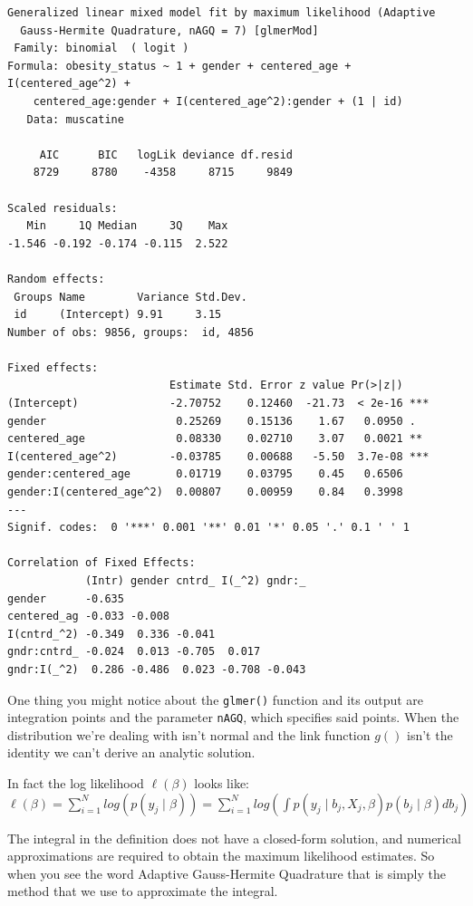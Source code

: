 \documentclass[
  letterpaper,
  DIV=11,
  numbers=noendperiod]{scrreprt}
\begin{document}
\begin{verbatim}
Generalized linear mixed model fit by maximum likelihood (Adaptive
  Gauss-Hermite Quadrature, nAGQ = 7) [glmerMod]
 Family: binomial  ( logit )
Formula: obesity_status ~ 1 + gender + centered_age + I(centered_age^2) +  
    centered_age:gender + I(centered_age^2):gender + (1 | id)
   Data: muscatine

     AIC      BIC   logLik deviance df.resid 
    8729     8780    -4358     8715     9849 

Scaled residuals: 
   Min     1Q Median     3Q    Max 
-1.546 -0.192 -0.174 -0.115  2.522 

Random effects:
 Groups Name        Variance Std.Dev.
 id     (Intercept) 9.91     3.15    
Number of obs: 9856, groups:  id, 4856

Fixed effects:
                         Estimate Std. Error z value Pr(>|z|)    
(Intercept)              -2.70752    0.12460  -21.73  < 2e-16 ***
gender                    0.25269    0.15136    1.67   0.0950 .  
centered_age              0.08330    0.02710    3.07   0.0021 ** 
I(centered_age^2)        -0.03785    0.00688   -5.50  3.7e-08 ***
gender:centered_age       0.01719    0.03795    0.45   0.6506    
gender:I(centered_age^2)  0.00807    0.00959    0.84   0.3998    
---
Signif. codes:  0 '***' 0.001 '**' 0.01 '*' 0.05 '.' 0.1 ' ' 1

Correlation of Fixed Effects:
            (Intr) gender cntrd_ I(_^2) gndr:_
gender      -0.635                            
centered_ag -0.033 -0.008                     
I(cntrd_^2) -0.349  0.336 -0.041              
gndr:cntrd_ -0.024  0.013 -0.705  0.017       
gndr:I(_^2)  0.286 -0.486  0.023 -0.708 -0.043
\end{verbatim}

One thing you might notice about the \texttt{glmer()} function and its
output are integration points and the parameter \texttt{nAGQ}, which
specifies said points. When the distribution we're dealing with isn't
normal and the link function \(g()\) isn't the identity we can't derive
an analytic solution.

In fact the log likelihood \(\ell(\beta)\) looks like:
\(\ell(\beta) = \sum^N_{i=1}log( p(y_j \mid \beta) ) = \sum^N_{i=1}log( \int p(y_j \mid b_j,X_j, \beta)p(b_j \mid \beta) db_j)\)

The integral in the definition does not have a closed-form solution, and
numerical approximations are required to obtain the maximum likelihood
estimates. So when you see the word Adaptive Gauss-Hermite Quadrature
that is simply the method that we use to approximate the integral.
\end{document}
